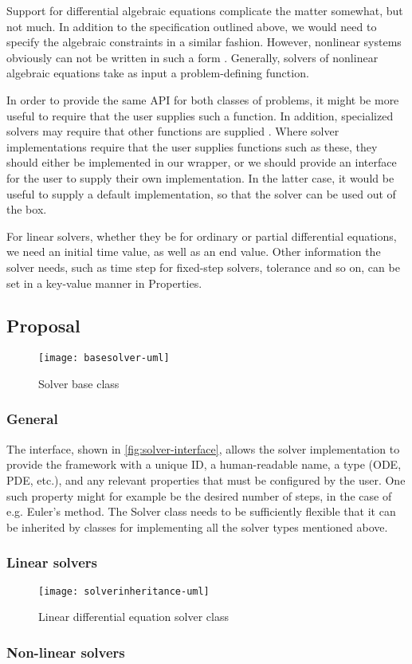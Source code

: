 \documentclass[../../main.tex]{subfiles}
\begin{document}
Support for differential algebraic equations complicate the matter somewhat, but not much.
In addition to the specification outlined above, we would need to specify the algebraic constraints in a similar fashion.
However, nonlinear systems obviously can not be written in such a form \cite{khalil}.
Generally, solvers of nonlinear algebraic equations take as input a problem-defining function.

In order to provide the same API for both classes of problems, it might be more useful to require that the user supplies such a function.
In addition, specialized solvers may require that other functions are supplied \cite{kinsol}\cite{cvode}\cite{ida}.
Where solver implementations require that the user supplies functions such as these, they should either be implemented in our wrapper,
or we should provide an interface for the user to supply their own implementation.
In the latter case, it would be useful to supply a default implementation, so that the solver can be used out of the box.

For linear solvers, whether they be for ordinary or partial differential equations, we need an initial time value, as well as an end value.
Other information the solver needs, such as time step for fixed-step solvers, tolerance and so on, can be set in a key-value manner in Properties.

\subsection{Proposal}

\begin{figure}[h]
  \centering
  \texttt{[image: basesolver-uml]}
  \caption{Solver base class}
  \label{fig:solver-baseclass}
\end{figure}

\subsubsection{General}

The interface, shown in \cref{fig:solver-interface}, allows the solver implementation to provide the framework with a unique ID, a human-readable name, a
type (ODE, PDE, etc.\@), and any relevant properties that must be configured by the user.
One such property might for example be the desired number of steps, in the case of e.g. Euler's method.
The Solver class needs to be sufficiently flexible that it can be inherited by classes for implementing all the solver types mentioned above.

\subsubsection{Linear solvers}

\begin{figure}[h]
  \centering
  \texttt{[image: solverinheritance-uml]}
  \caption{Linear differential equation solver class}
  \label{fig:solver-linear}
\end{figure}


\subsubsection{Non-linear solvers}
\end{document}
